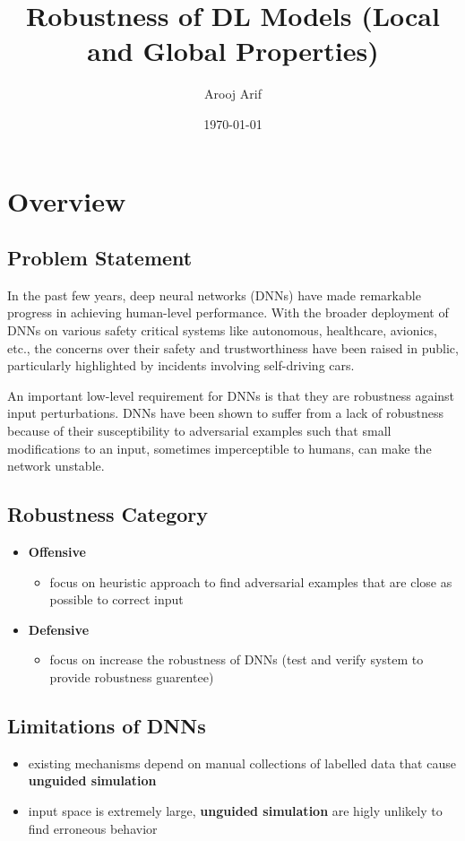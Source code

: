 \documentclass{article}
\title{Robustness of DL Models (Local and Global Properties)}
\author{Arooj Arif}
\date{\today} %
\begin{document}
\maketitle %
\section{Overview}

\subsection{Problem Statement}
In the past few years, deep neural networks (DNNs) have made remarkable progress in achieving human-level performance. With the broader deployment of DNNs on various safety critical systems like autonomous, healthcare, avionics, etc., the concerns over their safety and trustworthiness have been raised in public, particularly highlighted by incidents involving self-driving cars.

An important low-level requirement for DNNs is that they are robustness against input perturbations. DNNs have been shown to suffer from a lack of robustness because of their susceptibility to adversarial examples such that small modifications to an input, sometimes imperceptible to humans, can make the network unstable.

\subsection{Robustness Category}
\begin{itemize}
    \item \textbf{Offensive} 
       \begin{itemize} %
        \item focus on heuristic approach to find adversarial examples that are close as possible to correct input
    \end{itemize} %
     \item \textbf{Defensive}
            \begin{itemize} %
        \item focus on increase the robustness of DNNs (test and verify system to provide robustness guarentee)
    \end{itemize} %
\end{itemize} 

\subsection{Limitations of DNNs}
   \begin{itemize}
     \item existing mechanisms depend on manual collections of labelled data that cause \textbf{unguided simulation}
     \item input space is extremely large, \textbf{unguided simulation} are higly unlikely to find erroneous behavior
    \end{itemize}
\end{document}
